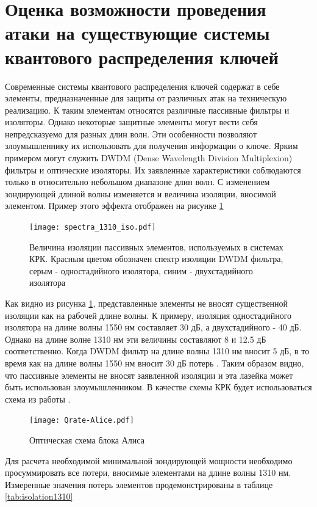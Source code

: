 \section{Оценка возможности проведения атаки на существующие системы квантового распределения ключей}\label{sec:ch4/sect6}
Современные системы квантового распределения ключей содержат в себе элементы, предназначенные для защиты от различных атак на техническую реализацию. К таким элементам относятся различные пассивные фильтры и изоляторы.
Однако некоторые защитные элементы могут вести себя непредсказуемо для разных длин волн. Эти особенности позволяют злоумышленнику их использовать для получения информации о ключе.
Ярким примером могут служить DWDM (Dense Wavelength Division Multiplexion) фильтры и оптические изоляторы. Их заявленные характеристики соблюдаются только в относительно небольшом диапазоне длин волн.
С изменением зондирующей длиной волны изменяется и величина изоляции, вносимой элементом. Пример этого эффекта отображен на рисунке \ref{fig:isolation_spectrums}
\begin{figure}
    \centering
    \texttt{[image: spectra\_1310\_iso.pdf]}
    \caption{Величина изоляции пассивных элементов, используемых в системах КРК. Красным цветом обозначен спектр изоляции DWDM фильтра, серым - одностадийного изолятора, синим - двухстадийного изолятора}
    \label{fig:isolation_spectrums}
\end{figure}
Как видно из рисунка \ref{fig:isolation_spectrums}, представленные элементы не вносят существенной изоляции как на рабочей длине волны. К примеру, изоляция одностадийного изолятора на длине волны 1550 нм составляет 30 дБ, а двухстадийного - 40 дБ. Однако на длине волне 1310 нм эти величины составляют 8 и 12.5 дБ соответственно.
Когда DWDM фильтр на длине волны 1310 нм вносит 5 дБ, в то время как на длине волны 1550 нм вносит 30 дБ потерь \cite{ponosova2022}. Таким образом видно, что пассивные элементы не вносят заявленной изоляции и эта лазейка может быть использован злоумышленником.
В качестве схемы КРК будет использоваться схема из работы \cite{makarov2023}. 
\begin{figure}
    \centering
    \texttt{[image: Qrate-Alice.pdf]}
    \caption{Оптическая схема блока Алиса}\label{fig:Alice_qrate}
\end{figure}
Для расчета необходимой минимальной зондирующей мощности необходимо просуммировать все потери, вносимые элементами на длине волны 1310 нм. 
Измеренные значения потерь элементов продемонстрированы в таблице \ref{tab:isolation1310}


